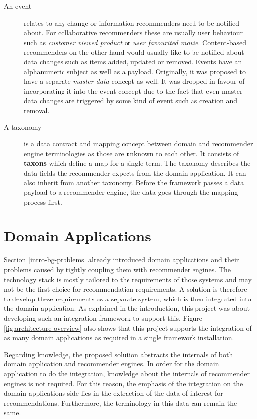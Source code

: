 \begin{description}
\item[\textnormal{An} event] relates to any change or information recommenders need to be notified about. For collaborative recommenders these are usually user behaviour such as \emph{customer viewed product} or \emph{user favourited movie}. Content-based recommenders on the other hand would usually like to be notified about data changes such as items added, updated or removed. Events have an alphanumeric subject as well as a payload. Originally, it was proposed to have a separate \emph{master data} concept as well. It was dropped in favour of incorporating it into the event concept due to the fact that even master data changes are triggered by some kind of event such as creation and removal.

\item[\textnormal{A} taxonomy] is a data contract and mapping concept between domain and recommender engine terminologies as those are unknown to each other. It consists of \textbf{taxons} which define a map for a single term. The taxonomy describes the data fields the recommender expects from the domain application. It can also inherit from another taxonomy. Before the framework passes a data payload to a recommender engine, the data goes through the mapping process first.

\end{description}

\section{Domain Applications}
\label{architecture-domain-applications}

Section \ref{intro-bg-problems} already introduced domain applications and their problems caused by tightly coupling them with recommender engines. The technology stack is mostly tailored to the requirements of those systems and may not be the first choice for recommendation requirements. A solution is therefore to develop these requirements as a separate system, which is then integrated into the domain application. As explained in the introduction, this project was about developing such an integration framework to support this. Figure \ref{fig:architecture-overview} also shows that this project supports the integration of as many domain applications as required in a single framework installation.

Regarding knowledge, the proposed solution abstracts the internals of both domain application and recommender engines. In order for the domain application to do the integration, knowledge about the internals of recommender engines is not required. For this reason, the emphasis of the integration on the domain applications side lies in the extraction of the data of interest for recommendations. Furthermore, the terminology in this data can remain the same.

